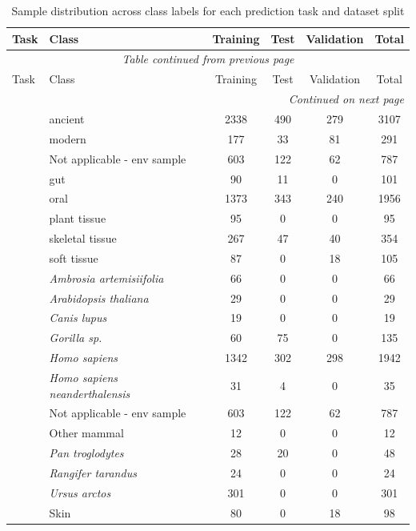 \begin{longtable}{lp{4.5cm}cccc}
\caption{Sample distribution across class labels for each prediction task and dataset split\label{tab:class_distribution}}\\
\toprule
Task & Class & Training & Test & Validation & Total \\
\midrule
\endfirsthead
\multicolumn{6}{c}{\textit{Table \thetable{} continued from previous page}} \\
\toprule
Task & Class & Training & Test & Validation & Total \\
\midrule
\endhead
\midrule
\multicolumn{6}{r}{\textit{Continued on next page}} \\
\endfoot
\bottomrule
\endlastfoot
\multirow{2}{*}{Sample Type} 
& ancient & 2338 & 490 & 279 & 3107 \\
 & modern & 177 & 33 & 81 & 291 \\
\addlinespace
\multirow{6}{*}{Community Type} 
& Not applicable - env sample & 603 & 122 & 62 & 787 \\
 & gut & 90 & 11 & 0 & 101 \\
 & oral & 1373 & 343 & 240 & 1956 \\
 & plant tissue & 95 & 0 & 0 & 95 \\
 & skeletal tissue & 267 & 47 & 40 & 354 \\
 & soft tissue & 87 & 0 & 18 & 105 \\
\addlinespace
\multirow{11}{*}{Sample Host} 
& \textit{Ambrosia artemisiifolia} & 66 & 0 & 0 & 66 \\
 & \textit{Arabidopsis thaliana} & 29 & 0 & 0 & 29 \\
 & \textit{Canis lupus} & 19 & 0 & 0 & 19 \\
 & \textit{Gorilla sp.} & 60 & 75 & 0 & 135 \\
 & \textit{Homo sapiens} & 1342 & 302 & 298 & 1942 \\
 & \textit{Homo sapiens neanderthalensis} & 31 & 4 & 0 & 35 \\
 & Not applicable - env sample & 603 & 122 & 62 & 787 \\
 & Other mammal & 12 & 0 & 0 & 12 \\
 & \textit{Pan troglodytes} & 28 & 20 & 0 & 48 \\
 & \textit{Rangifer tarandus} & 24 & 0 & 0 & 24 \\
 & \textit{Ursus arctos} & 301 & 0 & 0 & 301 \\
\addlinespace
\multirow{17}{*}{Material} 
& Skin & 80 & 0 & 18 & 98 \\

\end{longtable}
